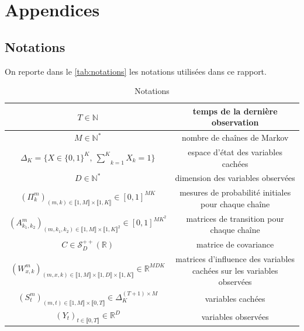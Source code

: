 \documentclass[10pt,a4paper]{article}
\begin{document}
\appendix

\section*{Appendices}

\renewcommand{\thesubsection}{\Alph{subsection}}

\subsection{Notations}
\label{Notations}
On reporte dans le \autoref{tab:notations} les notations utilisées
dans ce rapport.

\begin{table}[hpbt]

\begin{center}
  \begin{tabular}{|c|c|}
  \hline
  $T \in \mathbb{N}$ & temps de la dernière observation \\ \hline
  $M \in \mathbb{N}^*$ & nombre de chaînes de Markov \\ \hline
  $\Delta_K=\lbrace X \in \lbrace0,1\rbrace^K, \ 
  \underset{k=1}{\overset{K}{\sum}}X_k=1\rbrace$ & espace d'état des variables 
  cachées \\ \hline
  $D \in \mathbb{N}^*$ & dimension des variables observées \\ \hline
  $(\Pi_{k}^m)_{(m,k) \in \llbracket 1,M \rrbracket \times \llbracket 1,K 
  \rrbracket} \in [0,1]^{MK}$ & mesures de probabilité initiales pour chaque 
  chaîne \\ \hline
  $(A_{k_1,k_2}^m)_{(m,k_1,k_2) \in \llbracket 1,M \rrbracket \times \llbracket 
  1,K \rrbracket^2} \in [0,1]^{MK^2}$ & matrices de transition pour chaque chaîne 
   \\ \hline
  $C \in \mathcal{S}_D^{++}(\mathbb{R})$ & matrice de covariance \\ \hline
  $(W_{x,k}^m)_{(m,x,k) \in \llbracket 1,M \rrbracket \times \llbracket 1,D 
  \rrbracket \times \llbracket 1,K \rrbracket} \in \mathbb{R}^{MDK}$ & matrices 
  d'influence des variables cachées sur les variables observées \\ \hline
  $(S_t^m)_{(m,t) \in \llbracket 1,M \rrbracket \times \llbracket 0,T \rrbracket 
  } \in \Delta_K^{(T+1)\times M}$ & variables cachées \\ \hline
  $(Y_t)_{t \in \llbracket 0,T \rrbracket} \in \mathbb{R}^D$ & variables 
  observées \\ \hline
  \end{tabular}
  \caption{Notations\label{tab:notations}}
\end{center}
\end{table}
\end{document}

